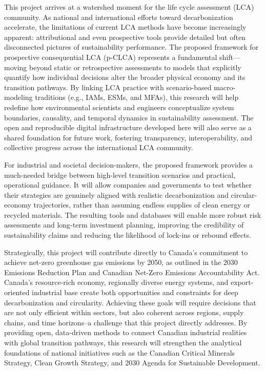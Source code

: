 \documentclass[compact]{nserc} %
\begin{document}
\begin{markdown}
This project arrives at a watershed moment for the life cycle assessment (LCA) community. As national and international efforts toward decarbonization accelerate, the limitations of current LCA methods have become increasingly apparent: attributional and even prospective tools provide detailed but often disconnected pictures of sustainability performance. The proposed framework for prospective consequential LCA (p-CLCA) represents a fundamental shift—moving beyond static or retrospective assessments to models that explicitly quantify how individual decisions alter the broader physical economy and its transition pathways. By linking LCA practice with scenario-based macro-modeling traditions (e.g., IAMs, ESMs, and MFAs), this research will help redefine how environmental scientists and engineers conceptualize system boundaries, causality, and temporal dynamics in sustainability assessment. The open and reproducible digital infrastructure developed here will also serve as a shared foundation for future work, fostering transparency, interoperability, and collective progress across the international LCA community.

For industrial and societal decision-makers, the proposed framework provides a much-needed bridge between high-level transition scenarios and practical, operational guidance. It will allow companies and governments to test whether their strategies are genuinely aligned with realistic decarbonization and circular-economy trajectories, rather than assuming endless supplies of clean energy or recycled materials. The resulting tools and databases will enable more robust risk assessments and long-term investment planning, improving the credibility of sustainability claims and reducing the likelihood of lock-ins or rebound effects.

Strategically, this project will contribute directly to Canada’s commitment to achieve net-zero greenhouse gas emissions by 2050, as outlined in the 2030 Emissions Reduction Plan and Canadian Net-Zero Emissions Accountability Act. Canada’s resource-rich economy, regionally diverse energy systems, and export-oriented industrial base create both opportunities and constraints for deep decarbonization and circularity. Achieving these goals will require decisions that are not only efficient within sectors, but also coherent across regions, supply chains, and time horizons--a challenge that this project directly addresses. By providing open, data-driven methods to connect Canadian industrial realities with global transition pathways, this research will strengthen the analytical foundations of national initiatives such as the Canadian Critical Minerals Strategy, Clean Growth Strategy, and 2030 Agenda for Sustainable Development.


\end{markdown}
\end{document}
